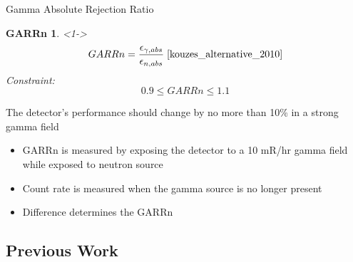 \begin{frame}{Gamma Absolute Rejection Ratio}
\newtheorem{thm3}{GARRn}
\begin{thm3}<1->
$$ GARRn = \frac{\epsilon_{\gamma,abs}}{\epsilon_{n,abs}} \; \protect \cite{kouzes_alternative_2010} $$
Constraint:
$$ 0.9 \leq GARRn \leq 1.1 $$
\end{thm3}
The detector's performance should change by no more than 10\% in a strong gamma field
\begin{itemize}
	\item GARRn is measured by exposing the detector to a 10 mR/hr gamma field while exposed to neutron source
	\item Count rate is measured when the gamma source is no longer present
	\item Difference determines the GARRn
\end{itemize}
\end{frame}

\subsection{Previous Work}

